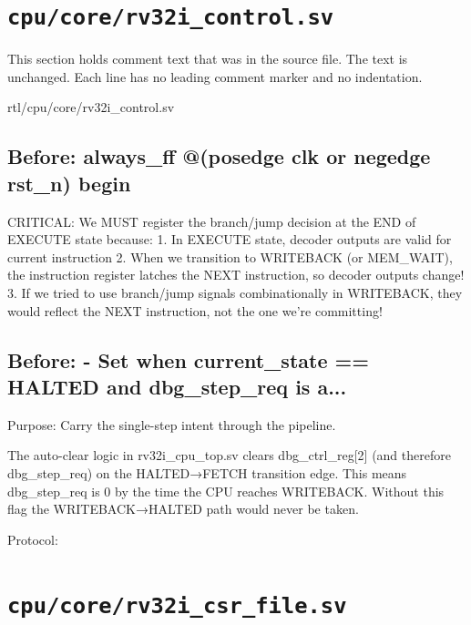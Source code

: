 \section{\texttt{cpu/core/rv32i\_control.sv}}\label{tm:mod:rv32i-control}

This section holds comment text that was in the source file. The text is unchanged. Each line has no leading comment marker and no indentation.

\begin{relocated}{rtl/cpu/core/rv32i_control.sv}

\subsection*{Before: always\_ff @(posedge clk or negedge rst\_n) begin}

\begin{textblock}
CRITICAL: We MUST register the branch/jump decision at the END of EXECUTE
state because:
1. In EXECUTE state, decoder outputs are valid for current instruction
2. When we transition to WRITEBACK (or MEM_WAIT), the instruction register
   latches the NEXT instruction, so decoder outputs change!
3. If we tried to use branch/jump signals combinationally in WRITEBACK,
   they would reflect the NEXT instruction, not the one we're committing!
\end{textblock}

\subsection*{Before: - Set when current\_state == HALTED and dbg\_step\_req is a...}

\begin{textblock}
Purpose: Carry the single-step intent through the pipeline.

The auto-clear logic in rv32i_cpu_top.sv clears dbg_ctrl_reg[2]
(and therefore dbg_step_req) on the HALTED→FETCH transition edge.
This means dbg_step_req is 0 by the time the CPU reaches WRITEBACK.
Without this flag the WRITEBACK→HALTED path would never be taken.

Protocol:
\end{textblock}

\end{relocated}

\section{\texttt{cpu/core/rv32i\_csr\_file.sv}}\label{tm:mod:rv32i-csr-file}


